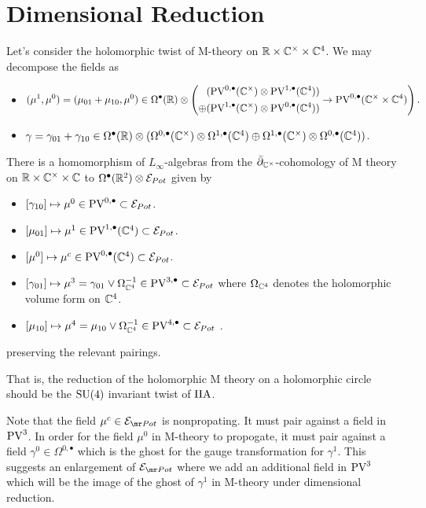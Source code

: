 \documentclass[11pt]{article}
\begin{document}
\section{Dimensional Reduction}
Let's consider the holomorphic twist of M-theory on $\mathbb{R}\times\mathbb{C}^\times\times\mathbb{C}^4$. We may decompose the fields as
\begin{itemize}
\item \[(\mu^{1}, \mu^{0})=(\mu_{01}+\mu_{10}, \mu^{0})\in\Omega^\bullet(\mathbb{R})\otimes\left (\begin{aligned} &( \text{PV}^{0,\bullet}(\mathbb{C}^\times)\otimes\text{PV}^{1,\bullet}(\mathbb{C}^4)) \\ \oplus & (\text{PV}^{1,\bullet}(\mathbb{C}^\times)\otimes\text{PV}^{0,\bullet}(\mathbb{C}^4))\end{aligned} \to\text{PV}^{0,\bullet}(\mathbb{C}^\times\times\mathbb{C}^4)\right ).\]
\item $\gamma=\gamma_{01}+\gamma_{10}\in \Omega^\bullet(\mathbb{R})\otimes(\Omega^{0,\bullet}(\mathbb{C}^\times)\otimes\Omega^{1,\bullet}(\mathbb{C}^4)\oplus\Omega^{1,\bullet}(\mathbb{C}^\times)\otimes\Omega^{0,\bullet}(\mathbb{C}^4))$.
\end{itemize}

\begin{prop}
There is a homomorphism of $L_\infty$-algebras from the $\bar{\partial}_{\mathbb{C}^\times}$-cohomology of M theory on $\mathbb{R}\times\mathbb{C}^\times\times\mathbb{C}$ to $\Omega^\bullet(\mathbb{R}^2)\otimes\mathcal{E}_{Pot}$ given by
\begin{itemize}
\item $[\gamma_{10}]\mapsto\mu^0\in\text{PV}^{0,\bullet}\subset\mathcal{E}_{Pot}$.
  \item $[\mu_{01}]\mapsto\mu^1\in\text{PV}^{1,\bullet}(\mathbb{C}^4)\subset\mathcal{E}_{Pot}$.
\item $[\mu^{0}]\mapsto\mu^{c}\in\text{PV}^{0, \bullet}(\mathbb{C}^{4})\subset\mathcal{E}_{Pot}$.
\item $[\gamma_{01}]\mapsto\mu^3 = \gamma_{01}\vee\Omega^{-1}_{\mathbb{C}^4}\in\text{PV}^{3,\bullet}\subset\mathcal{E}_{Pot}$ where $\Omega_{\mathbb{C}^4}$ denotes the holomorphic volume form on $\mathbb{C}^4$.
\item $[\mu_{10}]\mapsto\mu^4 =\mu_{10}\vee\Omega^{-1}_{\mathbb{C}^4}\in\text{PV}^{4,\bullet}\subset\mathcal{E}_{Pot}$ .


\end{itemize}
preserving the relevant pairings.
\end{prop}

That is, the reduction of the holomorphic M theory on a holomorphic circle should be the $\text{SU}(4)$ invariant twist of $\text{IIA}$.

\begin{rmk}
Note that the field $\mu^{c}\in \mc E_{\mr Pot}$ is nonpropating. It must pair against a field in $\text{PV}^{3}$. In order for the field $\mu^{0}$ in M-theory to propogate, it must pair against a field $\gamma^{0}\in \Omega^{0,\bullet}$ which is the ghost for the gauge transformation for $\gamma^{1}$. This suggests an enlargement of $\mc E_{\mr Pot}$ where we add an additional field in $\text{PV}^{3}$ which will be the image of the ghost of $\gamma^{1}$ in M-theory under dimensional reduction.
\end{rmk}
\end{document}
